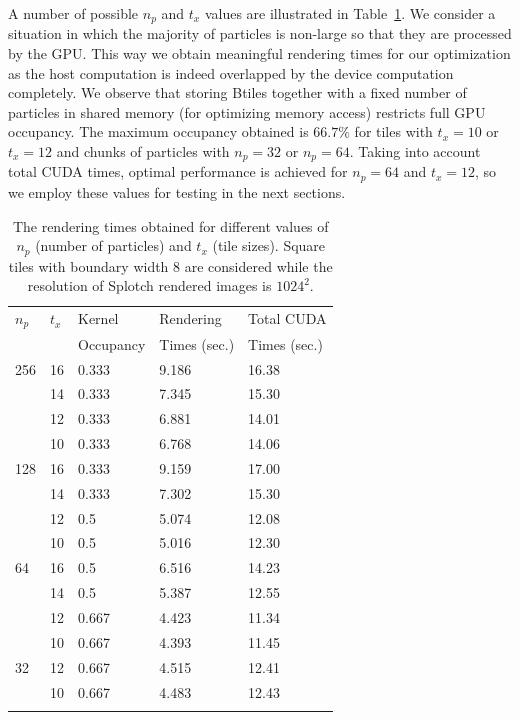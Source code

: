 \documentclass[smallextended]{svjour3}
\begin{document}
A number of possible $n_p$ and $t_x$ values are illustrated in Table~\ref{tab:tuning}. We consider a situation in which the majority of particles is non-large so that they are processed by the GPU. This way we obtain meaningful rendering times for our optimization as the host computation is indeed overlapped by the device computation completely. We observe that storing Btiles together with a fixed number of particles in shared memory (for optimizing memory access) restricts full GPU occupancy. The maximum occupancy obtained is $66.7\%$ for tiles with $t_x = 10$ or $t_x = 12$ and chunks of particles with $n_p = 32$ or $n_p=64$. Taking into account total CUDA times, optimal performance is achieved for $n_p=64$ and $t_x = 12$, so we employ these values for testing in the next sections.

\begin{table}
\caption{The rendering times obtained for different values of $n_p$ (number of particles) and $t_x$ (tile sizes). Square tiles with boundary width 8 are considered while the resolution of Splotch rendered images is $1024^{2}.$}
\label{tab:tuning}
\begin{tabular}{lllll}
\hline \noalign{\smallskip}
$n_p$ & $t_x$ & Kernel & Rendering & Total CUDA \\
            & & Occupancy & Times (sec.) & Times (sec.) \\
\noalign{\smallskip} \hline \noalign{\smallskip}
256   & 16 & 0.333 & 9.186 & 16.38 \\
      & 14 & 0.333 & 7.345  & 15.30 \\
      & 12 & 0.333 & 6.881  & 14.01 \\
      & 10 & 0.333 & 6.768 & 14.06 \\
128   & 16 & 0.333 & 9.159 & 17.00 \\
      & 14 & 0.333 & 7.302  & 15.30 \\
      & 12 & 0.5 & 5.074  & 12.08 \\
      & 10 & 0.5 & 5.016 & 12.30 \\ 
64    & 16 & 0.5 & 6.516 & 14.23 \\
      & 14 & 0.5 & 5.387 & 12.55 \\
      & 12 & 0.667 & 4.423 & 11.34 \\
      & 10 & 0.667 & 4.393 & 11.45 \\ 
32    & 12 & 0.667 & 4.515 & 12.41 \\
      & 10 & 0.667 & 4.483 & 12.43 \\ 
\noalign{\smallskip} \hline
\end{tabular}
\end{table}
\end{document}
